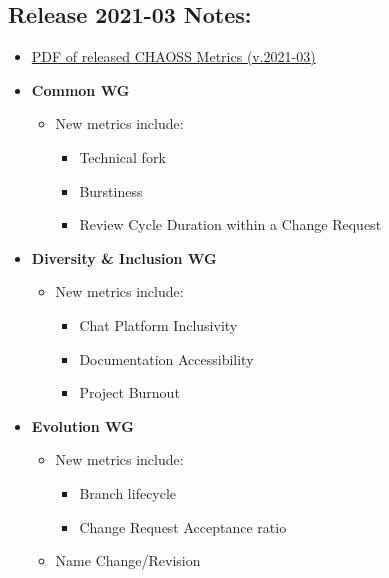 \hypertarget{release-2021-03-notes}{%
\subsection{Release 2021-03 Notes:}\label{release-2021-03-notes}}

\begin{itemize}
\tightlist
\item
  \href{https://chaoss.github.io/website/release/release-pdfs/CHAOSS-Metrics-Release-2021-03.pdf}{PDF
  of released CHAOSS Metrics (v.2021-03)}
\item
  \textbf{Common WG}

  \begin{itemize}
  \tightlist
  \item
    New metrics include:

    \begin{itemize}
    \tightlist
    \item
      Technical fork
    \item
      Burstiness
    \item
      Review Cycle Duration within a Change Request
    \end{itemize}
  \end{itemize}
\item
  \textbf{Diversity \& Inclusion WG}

  \begin{itemize}
  \tightlist
  \item
    New metrics include:

    \begin{itemize}
    \tightlist
    \item
      Chat Platform Inclusivity
    \item
      Documentation Accessibility
    \item
      Project Burnout
    \end{itemize}
  \end{itemize}
\item
  \textbf{Evolution WG}

  \begin{itemize}
  \tightlist
  \item
    New metrics include:

    \begin{itemize}
    \tightlist
    \item
      Branch lifecycle
    \item
      Change Request Acceptance ratio
    \end{itemize}
  \item
    Name Change/Revision


\end{itemize}
\end{itemize}
